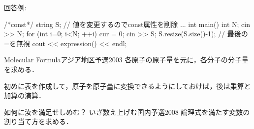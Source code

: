 回答例:
\begin{cbox}
/*const*/ string S; // 値を変更するのでconst属性を削除
...
int main() {
    int N;
    cin >> N;
    for (int i=0; i<N; ++i) {
        cur = 0;
        cin >> S;
        S.resize(S.size()-1); // 最後の=を無視
        cout << expression() << endl;
    }
}  
\end{cbox}

\begin{pbox}{Molecular Formula}{アジア地区予選2003}
各原子の原子量を元に，各分子の分子量を求める．

\end{pbox}

初めに表を作成して，原子を原子量に変換できるようにしておけば，後は乗算と加算の演算．

\begin{pbox}{如何に汝を満足せしめむ？ いざ数え上げむ}{国内予選2008}
論理式を満たす変数の割り当て方を求める．

\end{pbox}


